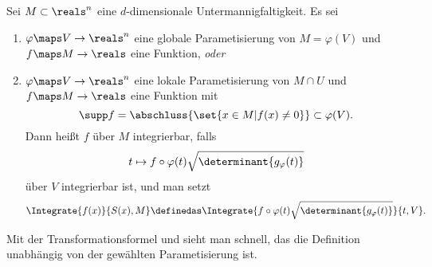 \begin{definition}\label{mannigfaltigkeit_integral}
  Sei \( M\subset \reals^n \) eine \( d \)-dimensionale Untermannigfaltigkeit. Es sei 
  \begin{enumerate}[label=\rechtsklammer{\alph*}]
    \item\label{mannigfaltigkeit_integral:globale_parametisierung} \( \varphi\maps V\to \reals^n \) eine globale Parametisierung von \( M=\varphi(V) \) und \( f\maps M\to \reals \) eine Funktion, \emph{oder}
    \item\label{mannigfaltigkeit_integral:lokale_parametisierung} \( \varphi\maps V\to \reals^n \) eine lokale Parametisierung von \( M\cap U \) und \( f\maps M\to \reals \) eine Funktion mit 
    \begin{equation*}
      \supp f=\abschluss{\set{x\in M|f(x)\neq 0}}\subset \varphi(V).
    \end{equation*}
    Dann heißt \( f \) über \( M \) integrierbar, falls
    \begin{equation*}
      t\mapsto f\circ \varphi(t)\sqrt{\determinant{g_{\varphi}(t)}}
    \end{equation*}
    über \( V \) integrierbar ist, und man setzt
    \begin{equation*}
      \Integrate{f(x)}{S(x),M}\definedas \Integrate{f\circ \varphi(t)\sqrt{\determinant{g_{\varphi}(t)}}}{t,V}.
    \end{equation*}
  \end{enumerate}
\end{definition}
\begin{bemerkung*}
  Mit der Transformationsformel und  sieht man schnell, das die Definition unabhängig von der gewählten Parametisierung ist.
\end{bemerkung*}
